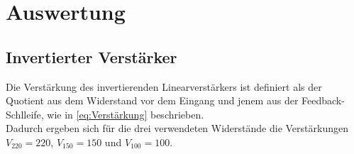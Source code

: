 \section{Auswertung}
\label{sec:Auswertung}

\subsection{Invertierter Verstärker}
\label{sec:Invertierter_Verstärker}
Die Verstärkung des invertierenden Linearverstärkers ist definiert als der Quotient aus dem Widerstand vor dem Eingang und jenem aus der Feedback-Schlleife, wie in \autoref{eq:Verstärkung} beschrieben.\\
Dadurch ergeben sich für die drei verwendeten Widerstände die Verstärkungen $V_{220} = 220$, $V_{150} = 150$ und $V_{100} = 100$.\\
